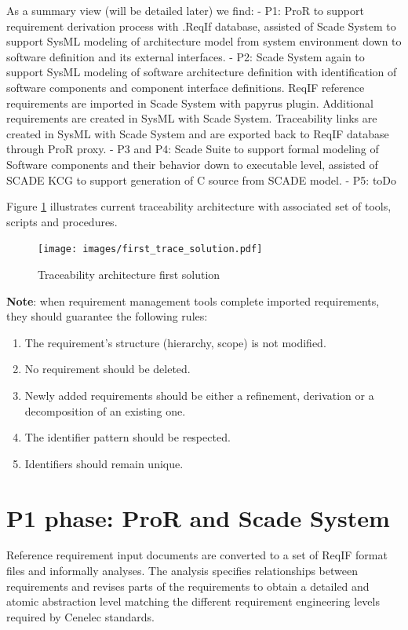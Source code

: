 \documentclass[11pt]{template/openetcs_report}
\begin{document}
As a summary view (will be detailed later) we find:
- P1: ProR to support requirement derivation process with .ReqIf database, assisted of Scade System to support SysML modeling of architecture model from system environment down to software definition and its external interfaces.
- P2: Scade System again to support SysML modeling of software architecture definition with identification of software components and component interface definitions. ReqIF reference requirements are imported in Scade System with papyrus  plugin. Additional requirements are created in SysML with Scade System. Traceability links are created in SysML with Scade System and are exported back to ReqIF database through ProR proxy. 
- P3 and P4: Scade Suite to support formal modeling of Software components and their behavior down to executable level, assisted of SCADE KCG to support generation of C source from SCADE model.
- P5: toDo

Figure \ref{fig:trace_first} illustrates current traceability architecture with associated set of tools, scripts and procedures.


\begin{figure}[htbp]
\centering
\texttt{[image: images/first\_trace\_solution.pdf]}
\caption{\label{fig:trace_first}Traceability architecture first solution}
\end{figure}

\textbf{Note}: when requirement management tools complete imported requirements, they should guarantee the following rules:
\begin{enumerate}
\item The requirement's structure (hierarchy, scope) is not modified.
\item No requirement should be deleted.
\item Newly added requirements should be either a refinement, derivation or a decomposition of an existing one.
\item The identifier pattern should be respected.
\item Identifiers should remain unique.
\end{enumerate}


\section{P1 phase: ProR and Scade System}

Reference requirement input documents are converted to a set of ReqIF format files and informally analyses. The analysis specifies relationships between requirements and revises parts of the requirements to obtain a detailed and atomic abstraction level matching the different requirement engineering levels required by Cenelec standards. 
\end{document}
